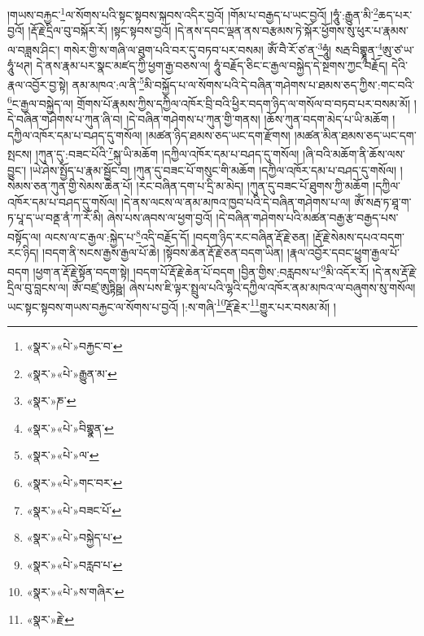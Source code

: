 །གཡས་བརྐྱང་\footnote{«སྣར་»«པེ་»བརྐྱང་བ་}ལ་སོགས་པའི་སྟང་སྟབས་སྐབས་འདིར་བྱའོ། །གོམ་པ་བརྒྱད་པ་ཡང་བྱའོ། །ཧཱུཾ་:རྒྱུན་མི་\footnote{«སྣར་»«པེ་»རྒྱུན་མ་}ཆད་པར་བྱའོ། །རྡོ་རྗེ་དྲིལ་བུ་བསྐོར་རོ། །སྟང་སྟབས་བྱའོ། །དེ་ནས་དབང་ལྡན་ནས་བརྩམས་ཏེ་སྐོར་ཕྱོགས་སུ་ཕུར་པ་རྣམས་ལ་བཟླས་ཤིང་། གསེར་གྱི་ས་གཞི་ལ་ཐུག་པའི་བར་དུ་བཏབ་པར་བསམ། ཨོཾ་བཻ་རོ་ཙ་ན་\footnote{«སྣར་»ཎ་}ཧཱུཾ། སརྦ་བིགྷྣཱན་\footnote{«སྣར་»«པེ་»བིགྷྣན་}ཨུ་ཙ་ཡ་ཧཱུཾ་ཕཊ། དེ་ནས་རྣམ་པར་སྣང་མཛད་ཀྱི་ཕྱག་རྒྱ་བཅས་ལ། ཧཱུཾ་བརྗོད་ཅིང་ང་རྒྱལ་བསྐྱེད་དེ་སྔགས་ཀྱང་བརྗོད། དེའི་རྣལ་འབྱོར་བྱ་སྟེ། ནམ་མཁའ་:ལ་ནི་\footnote{«སྣར་»«པེ་»ལ་}མི་བསྐྱོད་པ་ལ་སོགས་པའི་དེ་བཞིན་གཤེགས་པ་ཐམས་ཅད་ཀྱིས་:གང་བའི་\footnote{«སྣར་»«པེ་»གང་བར་}ང་རྒྱལ་བསྐྱེད་ལ། གྲོགས་པོ་རྣམས་ཀྱིས་དཀྱིལ་འཁོར་བྲི་བའི་ཕྱིར་བདག་ཉིད་ལ་གསོལ་བ་བཏབ་པར་བསམ་མོ། །དེ་བཞིན་གཤེགས་པ་ཀུན་ཞི་བ། །དེ་བཞིན་གཤེགས་པ་ཀུན་གྱི་གནས། །ཆོས་ཀུན་བདག་མེད་པ་ཡི་མཆོག །དཀྱིལ་འཁོར་དམ་པ་བཤད་དུ་གསོལ། །མཚན་ཉིད་ཐམས་ཅད་ཡང་དག་རྫོགས། །མཚན་མིན་ཐམས་ཅད་ཡང་དག་སྤངས། །ཀུན་དུ་:བཟང་པོའི་\footnote{«སྣར་»«པེ་»བཟང་པོ་}སྐུ་ཡི་མཆོག །དཀྱིལ་འཁོར་དམ་པ་བཤད་དུ་གསོལ། །ཞི་བའི་མཆོག་ནི་ཆོས་ལས་བྱུང་། །ཡེ་ཤེས་སྤྱོད་པ་རྣམ་སྦྱོང་བ། །ཀུན་དུ་བཟང་པོ་གསུང་གི་མཆོག །དཀྱིལ་འཁོར་དམ་པ་བཤད་དུ་གསོལ། །སེམས་ཅན་ཀུན་གྱི་སེམས་ཆེན་པོ། །རང་བཞིན་དག་པ་དྲི་མ་མེད། །ཀུན་དུ་བཟང་པོ་ཐུགས་ཀྱི་མཆོག །དཀྱིལ་འཁོར་དམ་པ་བཤད་དུ་གསོལ། །དེ་ནས་ལངས་ལ་ནམ་མཁའ་ཁྱབ་པའི་དེ་བཞིན་གཤེགས་པ་ལ། ཨོཾ་སརྦ་ཏ་ཐཱ་ག་ཏ་པཱ་ད་ཡ་བནྡ་ནཾ་ཀ་རོ་མི། ཞེས་པས་ཞབས་ལ་ཕྱག་བྱའོ། །དེ་བཞིན་གཤེགས་པའི་མཚན་བརྒྱ་རྩ་བརྒྱད་པས་བསྟོད་ལ། ལངས་ལ་ང་རྒྱལ་:སྐྱེད་པ་\footnote{«སྣར་»«པེ་»བསྐྱེད་པ་}འདི་བརྗོད་དོ། །བདག་ཉིད་རང་བཞིན་རྡོ་རྗེ་ཅན། །རྡོ་རྗེ་སེམས་དཔའ་བདག་རང་ཉིད། །བདག་ནི་སངས་རྒྱས་རྒྱལ་པོ་ཆེ། །སྟོབས་ཆེན་རྡོ་རྗེ་ཅན་བདག་ཡིན། །རྣལ་འབྱོར་དབང་ཕྱུག་རྒྱལ་པོ་བདག །ཕྱག་ན་རྡོ་རྗེ་སྟོན་བདག་སྟེ། །བདག་པོ་རྡོ་རྗེ་ཆེན་པོ་བདག །བྱིན་གྱིས་:བརླབས་པ་\footnote{«སྣར་»«པེ་»བརླབ་པ་}མི་འདོར་རོ། །དེ་ནས་རྡོ་རྗེ་དྲིལ་བུ་བླངས་ལ། ཨོཾ་བཛྲ་ཨུཏྟིཥྛ། ཞེས་པས་ཇི་ལྟར་སྤྲུལ་པའི་ལྷའི་དཀྱིལ་འཁོར་ནམ་མཁའ་ལ་བཞུགས་སུ་གསོལ། ཡང་སྟང་སྟབས་གཡས་བརྐྱང་ལ་སོགས་པ་བྱའོ། །:ས་གཞི་\footnote{«སྣར་»«པེ་»ས་གཞིར་}རྡོ་རྗེར་\footnote{«སྣར་»རྗེ་}གྱུར་པར་བསམ་མོ། །
